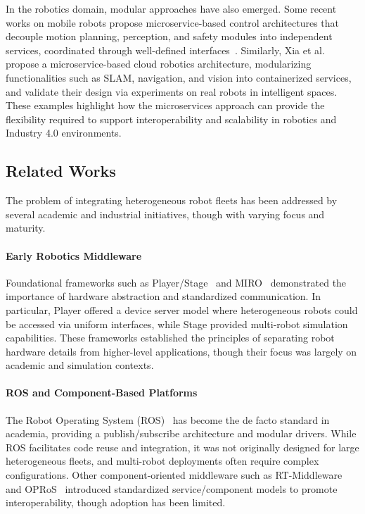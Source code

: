 \documentclass[conference]{IEEEtran}
\begin{document}
In the robotics domain, modular approaches have also emerged. 
%
Some recent works on mobile robots propose microservice-based control architectures 
 that decouple motion planning, perception, and safety modules into independent services, 
 coordinated through well-defined interfaces~\cite{DBLP:journals/ras/SchrickHTK25}. 
% 
Similarly, Xia et al.~\cite{DBLP:journals/ras/XiaZWCL18} propose a microservice-based cloud robotics architecture, 
 modularizing functionalities such as SLAM, navigation, and vision into containerized services,
 and validate their design via experiments on real robots in intelligent spaces.
% 
These examples highlight how the microservices approach can provide the flexibility required 
 to support interoperability and scalability in robotics and Industry 4.0 environments.

\subsection{Related Works}
The problem of integrating heterogeneous robot fleets has been addressed 
 by several academic and industrial initiatives, though with varying focus and maturity.

\paragraph{Early Robotics Middleware} 
Foundational frameworks such as Player/Stage~\cite{vaughan2003player} 
 and MIRO~\cite{DBLP:journals/trob/UtzSEK02} demonstrated the importance 
 of hardware abstraction and standardized communication. 
% 
In particular, Player offered a device server model where heterogeneous robots could be accessed via uniform interfaces, 
 while Stage provided multi-robot simulation capabilities. 
% 
These frameworks established the principles of separating robot hardware details from higher-level applications, 
 though their focus was largely on academic and simulation contexts.

\paragraph{ROS and Component-Based Platforms} 
The Robot Operating System (ROS)~\cite{quigley2009ros} has become the de facto standard in academia, 
 providing a publish/subscribe architecture and modular drivers. 
% 
While ROS facilitates code reuse and integration, it was not originally designed for large heterogeneous fleets, 
 and multi-robot deployments often require complex configurations. 
% 
Other component-oriented middleware such as RT-Middleware~\cite{DBLP:conf/iros/AndoSKKY05} 
 and OPRoS~\cite{jang2010opros} introduced standardized service/component models 
 to promote interoperability, though adoption has been limited.
\end{document}
